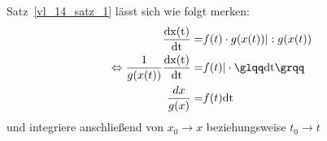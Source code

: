 \begin{Bemerkung}{
	Satz~\ref{vl_14_satz_1} lässt sich wie folgt merken:
	\begin{align*}
		\frac{\mathrm{dx(t)}}{\mathrm{dt}} = & f(t) \cdot g(x(t))
			\vert : g(x(t)) \\
		\Leftrightarrow 
		\frac{1}{g(x(t))} \frac{\mathrm{dx(t)}}{\mathrm{dt}} = & f(t)  \vert 
			\cdot \text{\glqq} \mathrm{dt}\text{\grqq} \\	
		\frac{dx}{g(x)} = &  f(t) \mathrm{dt}
	\end{align*}
	und integriere anschließend von $x_0 \rightarrow x$ beziehungsweise $t_0 
	\rightarrow t$
}\end{Bemerkung}